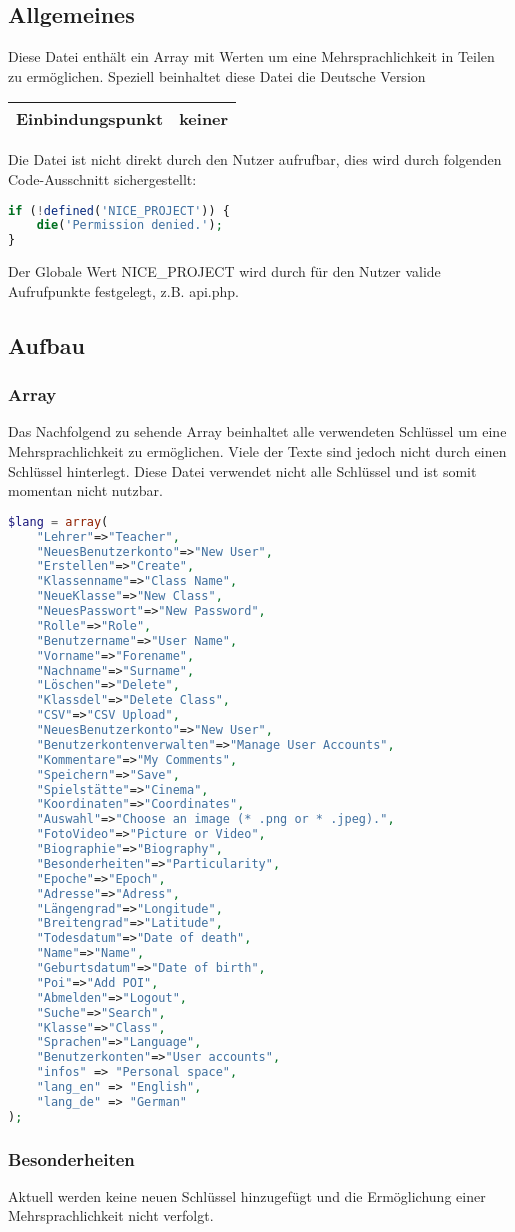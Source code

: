 \label{lang:en}
\subsection{Allgemeines} Diese Datei enthält ein Array mit Werten um eine Mehrsprachlichkeit in Teilen zu ermöglichen. Speziell beinhaltet diese Datei die Deutsche Version
\begin{table}[H]
	\begin{tabular}{|c|p{11cm}|}
		\hline
		\textbf{Einbindungspunkt} & keiner \\ \hline
	\end{tabular}
\end{table}
Die Datei ist nicht direkt durch den Nutzer aufrufbar, dies wird durch folgenden Code-Ausschnitt sichergestellt:
\begin{lstlisting}[language=php]
if (!defined('NICE_PROJECT')) {
	die('Permission denied.');
}
\end{lstlisting}
Der Globale Wert {\glqq NICE\_PROJECT\grqq} wird durch für den Nutzer valide Aufrufpunkte festgelegt, z.B. {\glqq api.php\grqq}.
\newpage
\subsection{Aufbau}
\subsubsection{Array}
Das Nachfolgend zu sehende Array beinhaltet alle verwendeten Schlüssel um eine Mehrsprachlichkeit zu ermöglichen. Viele der Texte sind jedoch nicht durch einen Schlüssel hinterlegt. Diese Datei verwendet nicht alle Schlüssel und ist somit momentan nicht nutzbar.
\begin{lstlisting}[language=php]
$lang = array(
	"Lehrer"=>"Teacher",
	"NeuesBenutzerkonto"=>"New User",
	"Erstellen"=>"Create",
	"Klassenname"=>"Class Name",
	"NeueKlasse"=>"New Class",
	"NeuesPasswort"=>"New Password",
	"Rolle"=>"Role",
	"Benutzername"=>"User Name",
	"Vorname"=>"Forename",
	"Nachname"=>"Surname",
	"Löschen"=>"Delete",
	"Klassdel"=>"Delete Class",
	"CSV"=>"CSV Upload",
	"NeuesBenutzerkonto"=>"New User",
	"Benutzerkontenverwalten"=>"Manage User Accounts",
	"Kommentare"=>"My Comments",
	"Speichern"=>"Save",
	"Spielstätte"=>"Cinema",
	"Koordinaten"=>"Coordinates",
	"Auswahl"=>"Choose an image (* .png or * .jpeg).",
	"FotoVideo"=>"Picture or Video",
	"Biographie"=>"Biography",
	"Besonderheiten"=>"Particularity",
	"Epoche"=>"Epoch",
	"Adresse"=>"Adress",
	"Längengrad"=>"Longitude",
	"Breitengrad"=>"Latitude",
	"Todesdatum"=>"Date of death",
	"Name"=>"Name",
	"Geburtsdatum"=>"Date of birth",
	"Poi"=>"Add POI",
	"Abmelden"=>"Logout",
	"Suche"=>"Search",
	"Klasse"=>"Class",
	"Sprachen"=>"Language",
	"Benutzerkonten"=>"User accounts",
	"infos" => "Personal space",
	"lang_en" => "English",
	"lang_de" => "German"
);
\end{lstlisting}
\subsubsection{Besonderheiten}
Aktuell werden keine neuen Schlüssel hinzugefügt und die Ermöglichung einer Mehrsprachlichkeit nicht verfolgt.